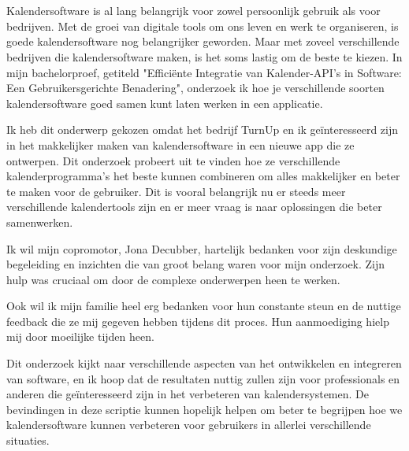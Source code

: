 
\chapter*{}%
\label{ch:voorwoord}

Kalendersoftware is al lang belangrijk voor zowel persoonlijk gebruik als voor bedrijven. Met de groei van digitale tools om ons leven en werk te organiseren, is goede kalendersoftware nog belangrijker geworden. Maar met zoveel verschillende bedrijven die kalendersoftware maken, is het soms lastig om de beste te kiezen. In mijn bachelorproef, getiteld "Efficiënte Integratie van Kalender-API's in Software: Een Gebruikersgerichte Benadering", onderzoek ik hoe je verschillende soorten kalendersoftware goed samen kunt laten werken in een applicatie.

Ik heb dit onderwerp gekozen omdat het bedrijf TurnUp en ik geïnteresseerd zijn in het makkelijker maken van kalendersoftware in een nieuwe app die ze ontwerpen. Dit onderzoek probeert uit te vinden hoe ze verschillende kalenderprogramma's het beste kunnen combineren om alles makkelijker en beter te maken voor de gebruiker. Dit is vooral belangrijk nu er steeds meer verschillende kalendertools zijn en er meer vraag is naar oplossingen die beter samenwerken.

Ik wil mijn copromotor, Jona Decubber, hartelijk bedanken voor zijn deskundige begeleiding en inzichten die van groot belang waren voor mijn onderzoek. Zijn hulp was cruciaal om door de complexe onderwerpen heen te werken.

Ook wil ik mijn familie heel erg bedanken voor hun constante steun en de nuttige feedback die ze mij gegeven hebben tijdens dit proces. Hun aanmoediging hielp mij door moeilijke tijden heen.

Dit onderzoek kijkt naar verschillende aspecten van het ontwikkelen en integreren van software, en ik hoop dat de resultaten nuttig zullen zijn voor professionals en anderen die geïnteresseerd zijn in het verbeteren van kalendersystemen. De bevindingen in deze scriptie kunnen hopelijk helpen om beter te begrijpen hoe we kalendersoftware kunnen verbeteren voor gebruikers in allerlei verschillende situaties.

